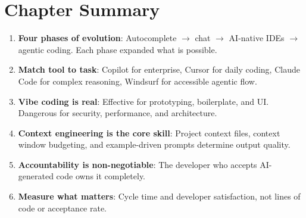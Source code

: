 \section{Chapter Summary}

\begin{enumerate}[leftmargin=*]
    \item \textbf{Four phases of evolution}: Autocomplete $\to$ chat $\to$ AI-native IDEs $\to$ agentic coding. Each phase expanded what is possible.
    \item \textbf{Match tool to task}: Copilot for enterprise, Cursor for daily coding, Claude Code for complex reasoning, Windsurf for accessible agentic flow.
    \item \textbf{Vibe coding is real}: Effective for prototyping, boilerplate, and UI. Dangerous for security, performance, and architecture.
    \item \textbf{Context engineering is the core skill}: Project context files, context window budgeting, and example-driven prompts determine output quality.
    \item \textbf{Accountability is non-negotiable}: The developer who accepts AI-generated code owns it completely.
    \item \textbf{Measure what matters}: Cycle time and developer satisfaction, not lines of code or acceptance rate.
\end{enumerate}
